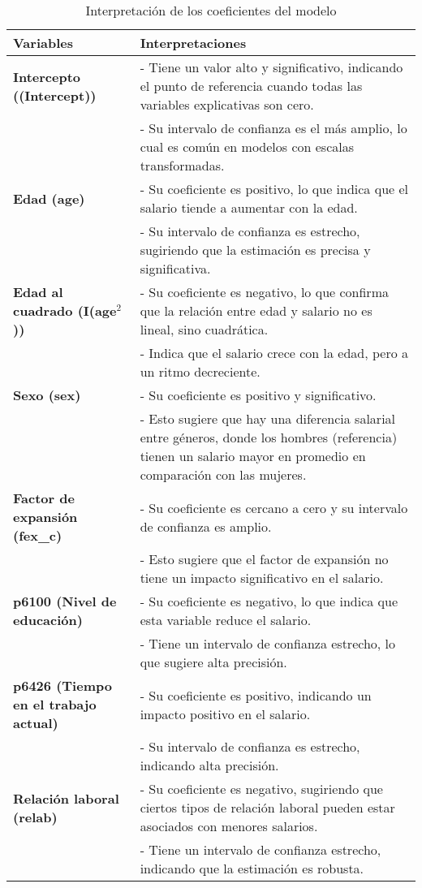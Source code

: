 \documentclass[12pt,a4paper,onecolumn]{article}
\begin{document}
\begin{table}[htbp]
    \centering
    \caption{Interpretación de los coeficientes del modelo}
    \label{tab:coef_interpretation}
    \begin{tabular}{lp{10cm}}
    \toprule
    \textbf{Variables} & \textbf{Interpretaciones} \\
    \midrule
    \textbf{Intercepto ((Intercept))} & - Tiene un valor alto y significativo, indicando el punto de referencia cuando todas las variables explicativas son cero.\\
     & - Su intervalo de confianza es el más amplio, lo cual es común en modelos con escalas transformadas.\\
    \midrule
    \textbf{Edad (age)} & - Su coeficiente es positivo, lo que indica que el salario tiende a aumentar con la edad.\\
     & - Su intervalo de confianza es estrecho, sugiriendo que la estimación es precisa y significativa.\\
    \midrule
    \textbf{Edad al cuadrado (I(age$^2$))} & - Su coeficiente es negativo, lo que confirma que la relación entre edad y salario no es lineal, sino cuadrática.\\
     & - Indica que el salario crece con la edad, pero a un ritmo decreciente.\\
    \midrule
    \textbf{Sexo (sex)} & - Su coeficiente es positivo y significativo.\\
     & - Esto sugiere que hay una diferencia salarial entre géneros, donde los hombres (referencia) tienen un salario mayor en promedio en comparación con las mujeres.\\
    \midrule
    \textbf{Factor de expansión (fex\_c)} & - Su coeficiente es cercano a cero y su intervalo de confianza es amplio.\\
     & - Esto sugiere que el factor de expansión no tiene un impacto significativo en el salario.\\
    \midrule
    \textbf{p6100 (Nivel de educación)} & - Su coeficiente es negativo, lo que indica que esta variable reduce el salario.\\
     & - Tiene un intervalo de confianza estrecho, lo que sugiere alta precisión.\\
    \midrule
    \textbf{p6426 (Tiempo en el trabajo actual)} & - Su coeficiente es positivo, indicando un impacto positivo en el salario.\\
     & - Su intervalo de confianza es estrecho, indicando alta precisión.\\
    \midrule
    \textbf{Relación laboral (relab)} & - Su coeficiente es negativo, sugiriendo que ciertos tipos de relación laboral pueden estar asociados con menores salarios.\\
     & - Tiene un intervalo de confianza estrecho, indicando que la estimación es robusta.\\
    \bottomrule
    \end{tabular}
\end{table}
\end{document}
